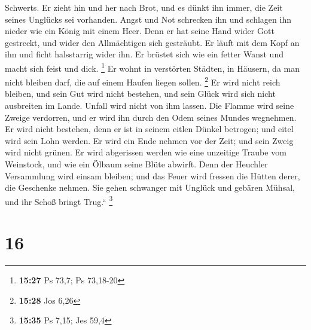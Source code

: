 Schwerts.  Er zieht hin und her nach Brot, und es dünkt
ihn immer, die Zeit seines Unglücks sei vorhanden.  Angst
und Not schrecken ihn und schlagen ihn nieder wie ein König mit einem
Heer.  Denn er hat seine Hand wider Gott gestreckt, und
wider den Allmächtigen sich gesträubt.  Er läuft mit dem
Kopf an ihn und ficht halsstarrig wider ihn.  Er brüstet
sich wie ein fetter Wanst und macht sich feist und dick. \footnote{\textbf{15:27}
  Ps 73,7; Ps 73,18-20}  Er wohnt in verstörten Städten,
in Häusern, da man nicht bleiben darf, die auf einem Haufen liegen
sollen. \footnote{\textbf{15:28} Jos 6,26}  Er wird nicht
reich bleiben, und sein Gut wird nicht bestehen, und sein Glück wird
sich nicht ausbreiten im Lande.  Unfall wird nicht von
ihm lassen. Die Flamme wird seine Zweige verdorren, und er wird ihn
durch den Odem seines Mundes wegnehmen.  Er wird nicht
bestehen, denn er ist in seinem eitlen Dünkel betrogen; und eitel wird
sein Lohn werden.  Er wird ein Ende nehmen vor der Zeit;
und sein Zweig wird nicht grünen.  Er wird abgerissen
werden wie eine unzeitige Traube vom Weinstock, und wie ein Ölbaum seine
Blüte abwirft.  Denn der Heuchler Versammlung wird einsam
bleiben; und das Feuer wird fressen die Hütten derer, die Geschenke
nehmen.  Sie gehen schwanger mit Unglück und gebären
Mühsal, und ihr Schoß bringt Trug.`` \footnote{\textbf{15:35} Ps 7,15;
  Jes 59,4}

\hypertarget{section-3}{%
\section{16}\label{section-3}}

